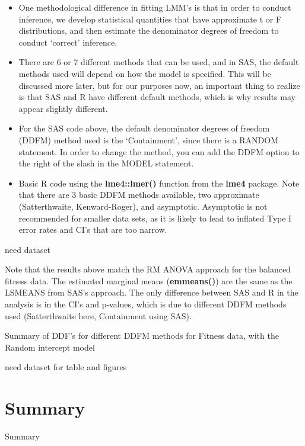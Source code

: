 \documentclass[
  9pt,
  ignorenonframetext,
]{beamer}
\providecommand{\tightlist}{%
  \setlength{\itemsep}{0pt}\setlength{\parskip}{0pt}}
\begin{document}
\begin{frame}{}
\protect\hypertarget{section-10}{}
\begin{itemize}
\item
  One methodological difference in fitting LMM's is that in order to
  conduct inference, we develop statistical quantities that have
  approximate t or F distributions, and then estimate the denominator
  degrees of freedom to conduct `correct' inference.
\item
  There are 6 or 7 different methods that can be used, and in SAS, the
  default methods used will depend on how the model is specified. This
  will be discussed more later, but for our purposes now, an important
  thing to realize is that SAS and R have different default methods,
  which is why results may appear slightly different.
\item
  For the SAS code above, the default denominator degrees of freedom
  (DDFM) method used is the `Containment', since there is a RANDOM
  statement. In order to change the method, you can add the DDFM option
  to the right of the slash in the MODEL statement.
\end{itemize}
\end{frame}

\begin{frame}{}
\protect\hypertarget{section-11}{}
\begin{itemize}
\tightlist
\item
  Basic R code using the \textbf{lme4::lmer()} function from the
  \textbf{lme4} package. Note that there are 3 basic DDFM methods
  available, two approximate (Satterthwaite, Kenward-Roger), and
  asymptotic. Asymptotic is not recommended for smaller data sets, as it
  is likely to lead to inflated Type I error rates and CI's that are too
  narrow.
\end{itemize}

\alert {need dataset}
\end{frame}

\begin{frame}{}
\protect\hypertarget{section-12}{}
Note that the results above match the RM ANOVA approach for the balanced
fitness data. The estimated marginal means (\textbf{emmeans()}) are the
same as the LSMEANS from SAS's approach. The only difference between SAS
and R in the analysis is in the CI's and p-values, which is due to
different DDFM methods used (Satterthwaite here, Containment using SAS).

Summary of DDF's for different DDFM methods for Fitness data, with the
Random intercept model

\alert {need dataset for table and figures}
\end{frame}

\hypertarget{summary}{%
\section{Summary}\label{summary}}

\begin{frame}{Summary}
\protect\hypertarget{summary-1}{}
\end{frame}
\end{document}
